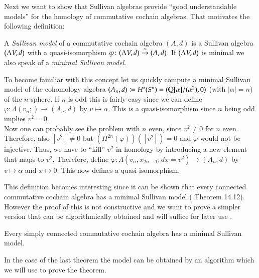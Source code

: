 Next we want to show that Sullivan algebras provide ``good understandable models'' for the homology of commutative cochain algebras. That motivates
the following definition:

\begin{Definition}
  A \emph{Sullivan model} of a commutative cochain algebra $(A,d)$ is a Sullivan algebra $(\Lambda V,d)$ with a quasi-isomorphism
  $\varphi \colon (\Lambda V,d) \overset{\simeq}{\to} (A,d)$. If $(\Lambda V,d)$ is minimal we also speak of a 
  \emph{minimal Sullivan model}.
\end{Definition}

\begin{Example}
\label{ex:MinimalModelOfSpheres}
 To become familiar with this concept let us quickly compute a minimal Sullivan model of the cohomology 
 algebra $(A_n,d) \coloneqq H^*(S^n) = (\mathbb{Q} [\alpha] / (\alpha^2), 0)$ (with $|\alpha| = n$) of the
 $n$-sphere. If $n$ is odd this is fairly easy since we can define 
 $\varphi \colon \Lambda (v_n;) \to (A_n,d)$ by $v \mapsto \alpha$. This is a quasi-isomorphism since $n$ being odd implies
 $ v^2 = 0$. \\
 Now one can probably see the problem with $n$ even, since $v^2 \neq 0$ for $n$ even. Therefore, also 
 $[v^2] \neq 0$ but $(H^{2n}(\varphi)) ([v^2]) = 0$ and $\varphi$ would not be injective. Thus, we have to ``kill'' $v^2$
 in homology by introducing a new element that maps to $v^2$. Therefore, define
 $\varphi \colon \Lambda(v_n, x_{2n -1}; dx = v^2) \to (A_n,d)$ by $v \mapsto \alpha$ and $ x \mapsto 0$.
 This now defines a quasi-isomorphism.
\end{Example}

\begin{Remark}
\label{rem:MinimalSullivanModelsExist}
This definition becomes interesting since it can be shown that every connected commutative cochain algebra has a minimal Sullivan model
(\cite{Felix2001} Theorem 14.12). However the proof of this is not constructive and we want to prove a simpler 
version that can be algorithmically obtained and will suffice for later use .
\end{Remark}

\begin{Theorem}
 \label{thm:MinimalSullivanModelsExistForSimplyConnected}
 Every simply connected commutative cochain algebra has a minimal Sullivan model.
\end{Theorem}

In the case of the last theorem the model can be obtained by an algorithm which we will use to prove the theorem.

